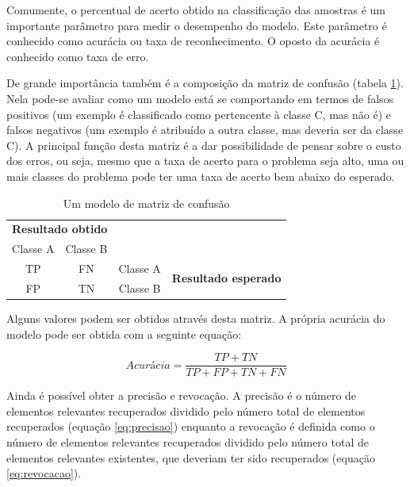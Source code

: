 Comumente, o percentual de acerto obtido na classificação das amostras é um importante parâmetro para medir o desempenho do modelo. Este parâmetro é conhecido como acurácia ou taxa de reconhecimento. O oposto da acurácia é conhecido como taxa de erro.

De grande importância também é a composição da matriz de confusão (tabela \ref{tab:matrixConfusao}). Nela pode-se avaliar como um modelo está se comportando em termos de falsos positivos (um exemplo é classificado como pertencente à classe C, mas não é) e falsos negativos (um exemplo é atribuído a outra classe, mas deveria ser da classe C). A principal função desta matriz é a dar possibilidade de pensar sobre o custo dos erros, ou seja, mesmo que a taxa de acerto para o problema seja alto, uma ou mais classes do problema pode ter uma taxa de acerto bem abaixo do esperado.

\begin{table}[h]
  \centering
  \begin{tabular}{cccc}
  \multicolumn{2}{c}{\textbf{Resultado obtido}}                  &                               &                                              \\ \cline{1-2}
  \multicolumn{1}{|c|}{Classe A} & \multicolumn{1}{c|}{Classe B} &                               &                                              \\ \cline{1-3}
  \multicolumn{1}{|c|}{TP}       & \multicolumn{1}{c|}{FN}       & \multicolumn{1}{c|}{Classe A} & \multirow{2}{*}{\textbf{Resultado esperado}} \\ \cline{1-3}
  \multicolumn{1}{|c|}{FP}       & \multicolumn{1}{c|}{TN}       & \multicolumn{1}{c|}{Classe B} &                                              \\ \cline{1-3}
  \end{tabular}
  \caption{Um modelo de matriz de confusão}
  \label{tab:matrixConfusao}
\end{table}

Alguns valores podem ser obtidos através desta matriz. A própria acurácia do modelo pode ser obtida com a seguinte equação:

\begin{equation}
  Acurácia = \frac{TP+TN}{TP+FP+TN+FN}
\label{eq:acuracia}
\end{equation}

Ainda é possível obter a precisão e revocação. A precisão é o número de elementos relevantes recuperados dividido pelo número total de elementos recuperados (equação \ref{eq:precisao}) enquanto a revocação é definida como o número de elementos relevantes recuperados dividido pelo número total de elementos relevantes existentes, que deveriam ter sido recuperados (equação \ref{eq:revocacao}).

